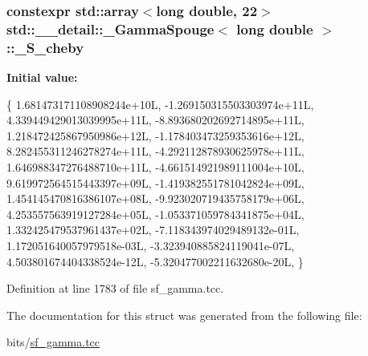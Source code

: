 \subsubsection[{\texorpdfstring{\+\_\+\+S\+\_\+cheby}{_S_cheby}}]{\setlength{\rightskip}{0pt plus 5cm}constexpr std\+::array$<$long double, 22$>$ {\bf std\+::\+\_\+\+\_\+detail\+::\+\_\+\+Gamma\+Spouge}$<$ long double $>$\+::\+\_\+\+S\+\_\+cheby\hspace{0.3cm}{\ttfamily [static]}}\hypertarget{structstd_1_1____detail_1_1__GammaSpouge_3_01long_01double_01_4_a9a0ccac34908981667d678ef8ef1fcbc}{}\label{structstd_1_1____detail_1_1__GammaSpouge_3_01long_01double_01_4_a9a0ccac34908981667d678ef8ef1fcbc}
{\bfseries Initial value\+:}
\begin{DoxyCode}
\{
    1.681473171108908244e+10L,
    -1.269150315503303974e+11L,
    4.339449429013039995e+11L,
    -8.893680202692714895e+11L,
    1.218472425867950986e+12L,
    -1.178403473259353616e+12L,
    8.282455311246278274e+11L,
    -4.292112878930625978e+11L,
    1.646988347276488710e+11L,
    -4.661514921989111004e+10L,
    9.619972564515443397e+09L,
    -1.419382551781042824e+09L,
    1.454145470816386107e+08L,
    -9.923020719435758179e+06L,
    4.253557563919127284e+05L,
    -1.053371059784341875e+04L,
    1.332425479537961437e+02L,
    -7.118343974029489132e-01L,
    1.172051640057979518e-03L,
    -3.323940885824119041e-07L,
    4.503801674404338524e-12L,
    -5.320477002211632680e-20L,
      \}
\end{DoxyCode}


Definition at line 1783 of file sf\+\_\+gamma.\+tcc.



The documentation for this struct was generated from the following file\+:\begin{DoxyCompactItemize}
\item 
bits/\hyperlink{sf__gamma_8tcc}{sf\+\_\+gamma.\+tcc}\end{DoxyCompactItemize}
